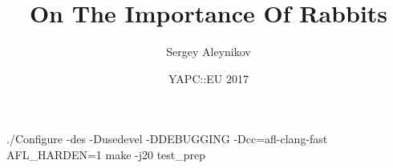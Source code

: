 \documentclass[mathserif,hyperref={urlcolor=cyan,colorlinks=true}]{beamer}
\title{On The Importance Of Rabbits}
\author{Sergey Aleynikov}
\date[August 2017]{YAPC::EU 2017}
\begin{document}
{

\begin{frame}
\titlepage
\end{frame}

\begin{frame}
\end{frame}


\begin{frame}
\end{frame}

{
\color{white}

\begin{frame}[fragile]
\begin{bashcode}
./Configure -des -Dusedevel -DDEBUGGING -Dcc=afl-clang-fast
AFL_HARDEN=1 make -j20 test_prep


\end{bashcode}
\end{frame}}}
\end{document}
